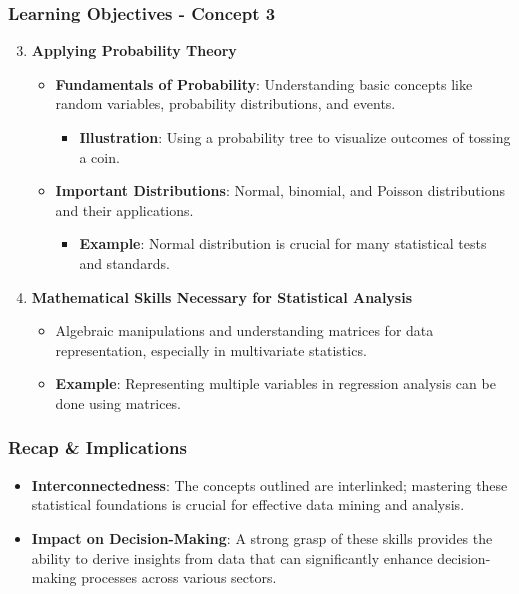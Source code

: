 \documentclass[aspectratio=169]{beamer}
\begin{document}
\begin{frame}[fragile]
    \frametitle{Learning Objectives - Concept 3}
    \begin{enumerate}
        \setcounter{enumi}{2} %
        \item \textbf{Applying Probability Theory}
        \begin{itemize}
            \item \textbf{Fundamentals of Probability}: Understanding basic concepts like random variables, probability distributions, and events.
            \begin{itemize}
                \item \textbf{Illustration}: Using a probability tree to visualize outcomes of tossing a coin.
            \end{itemize}
            \item \textbf{Important Distributions}: Normal, binomial, and Poisson distributions and their applications.
            \begin{itemize}
                \item \textbf{Example}: Normal distribution is crucial for many statistical tests and standards.
            \end{itemize}
        \end{itemize}
        
        \item \textbf{Mathematical Skills Necessary for Statistical Analysis}
        \begin{itemize}
            \item Algebraic manipulations and understanding matrices for data representation, especially in multivariate statistics.
            \item \textbf{Example}: Representing multiple variables in regression analysis can be done using matrices.
        \end{itemize}
    \end{enumerate}
\end{frame}

\begin{frame}[fragile]
    \frametitle{Recap \& Implications}
    \begin{itemize}
        \item \textbf{Interconnectedness}: The concepts outlined are interlinked; mastering these statistical foundations is crucial for effective data mining and analysis.
        \item \textbf{Impact on Decision-Making}: A strong grasp of these skills provides the ability to derive insights from data that can significantly enhance decision-making processes across various sectors.
    \end{itemize}
\end{frame}
\end{document}
